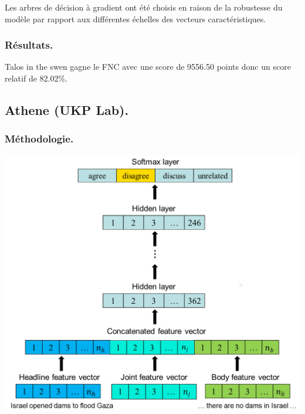 \documentclass[onecolumn, 12pt]{article}
\begin{document}
Les arbres de décision à gradient ont été choisis en raison de la robustesse du modèle par rapport aux différentes échelles des vecteurs caractéristiques.

\subsubsection{Résultats.}
Talos in the swen gagne le FNC avec une score de 9556.50 points donc un score relatif de 82.02\%.




\subsection{Athene (UKP Lab).}
\subsubsection{Méthodologie.}

\begin{center}
 \includegraphics[scale=0.25]{../../img/model/athene/athene_model.png}
 \label{fig3}
\end{center}
\end{document}
